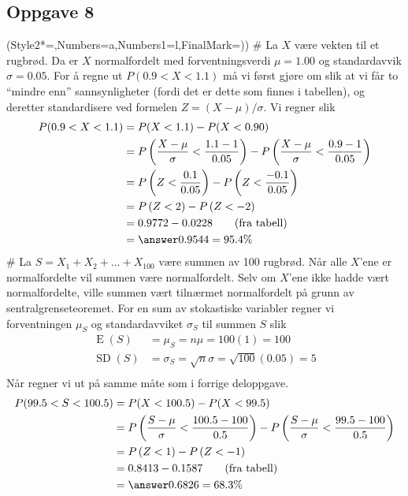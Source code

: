 \subsection*{Oppgave 8}
\begin{easylist}[enumerate]
	\ListProperties(Style2*=,Numbers=a,Numbers1=l,FinalMark={)})
	# La $X$ være vekten til et rugbrød.
	Da er $X$ normalfordelt med forventningsverdi $\mu = 1.00$ og standardavvik $\sigma = 0.05$.
	For å regne ut $P(0.9 < X < 1.1)$ må vi først gjøre om slik at vi får to ``mindre enn'' sannsynligheter (fordi det er dette som finnes i tabellen), og deretter standardisere ved formelen $Z = (X - \mu) / \sigma$.
	Vi regner slik
	\begin{align*}
		P(0.9 < X < 1.1) &= P(X < 1.1) - P(X < 0.90) \\
		&= P\left( \frac{X - \mu}{\sigma} <  \frac{1.1 - 1}{0.05} \right) -
		P\left( \frac{X - \mu}{\sigma} <  \frac{0.9 - 1}{0.05} \right) \\
		&= P\left( Z <  \frac{0.1}{0.05} \right) -
		P\left( Z <  \frac{-0.1}{0.05} \right) \\
		&= P\left( Z <  2 \right) -
		P\left( Z <  -2 \right) \\
		&= 0.9772 - 0.0228 \qquad (\text{fra tabell}) \\
		&= \answer{0.9544 = 95.4 \%}
	\end{align*}
	# La $S = X_1 + X_2 + \dots + X_{100}$ være summen av 100 rugbrød.
	Når alle $X$'ene er normalfordelte vil summen være normalfordelt.
	Selv om $X$'ene ikke hadde vært normalfordelte, ville summen vært tilnærmet normalfordelt på grunn av sentralgrenseteoremet.
	For en sum av stokastiske variabler regner vi forventningen $\mu_S$ og standardavviket $\sigma_S$ til summen $S$ slik
	\begin{align*}
		\operatorname{E}(S) &= \mu_S = n \mu = 100 (1) = 100 \\
		\operatorname{SD}(S) &= \sigma_S = \sqrt{n} \sigma = \sqrt{100} (0.05) = 5 \\
	\end{align*}
	Når regner vi ut på samme måte som i forrige deloppgave.
	\begin{align*}
		P(99.5 < S < 100.5) &= P(X < 100.5) - P(X < 99.5) \\
		&= P\left( \frac{S - \mu}{\sigma} <  \frac{100.5 - 100}{0.5} \right) -
		P\left( \frac{S - \mu}{\sigma} <  \frac{99.5 - 100}{0.5} \right) \\
		&= P\left( Z <  1 \right) -
		P\left( Z <  -1 \right) \\
		&= 0.8413 - 0.1587 \qquad (\text{fra tabell}) \\
		&= \answer{0.6826 = 68.3 \%}
	\end{align*}
\end{easylist}

